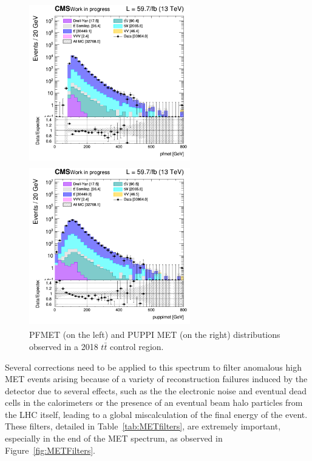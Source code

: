 \documentclass[a4paper, 10pt, openright]{report}
\begin{document}
\begin{figure}[htbp]
\centering
\begin{minipage}[b]{.49\textwidth}
\includegraphics[width=7cm, height=7cm]{figs/2018/log_cratio_ttbarCR_ll_pfmet_extended.png}
\end{minipage}\hfill
\begin{minipage}[b]{.49\textwidth}
\includegraphics[width=7cm, height=7cm]{figs/2018/log_cratio_ttbarCR_ll_puppimet.png}
\end{minipage} \hfill
\caption{PFMET (on the left) and \ac{PUPPI} \ac{MET} (on the right) distributions observed in a 2018 $t \bar t$ control region.}
\label{fig:metStudy}
\end{figure}

Several corrections need to be applied to this spectrum to filter anomalous high \ac{MET} events arising because of a variety of reconstruction failures induced by the detector due to several effects, such as the the electronic noise and eventual dead cells in the calorimeters or the presence of an eventual beam halo particles from the \ac{LHC} itself, leading to a global miscalculation of the final energy of the event. These filters, detailed in Table~\ref{tab:METfilters}, are extremely important, especially in the end of the \ac{MET} spectrum, as observed in Figure~\ref{fig:METFilters}.
\end{document}
